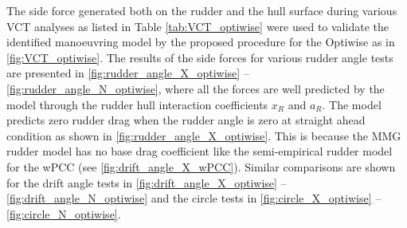 The side force generated both on the rudder and the hull surface during various VCT analyses as listed in Table \ref{tab:VCT_optiwise} were used to validate the identified manoeuvring model by the proposed procedure for the Optiwise as in \autoref{fig:VCT_optiwise}. The results of the side forces for various rudder angle tests are presented in \autoref{fig:rudder_angle_X_optiwise} -- \autoref{fig:rudder_angle_N_optiwise}, where all the forces are well predicted by the model through the rudder hull interaction coefficients $x_R$ and $a_R$. 
The model predicts zero rudder drag when the rudder angle is zero at straight ahead condition as shown in \autoref{fig:rudder_angle_X_optiwise}. This is because the MMG rudder model has no base drag coefficient like the semi-empirical rudder model for the wPCC (see \autoref{fig:drift_angle_X_wPCC}).
Similar comparisons are shown for the drift angle tests in \autoref{fig:drift_angle_X_optiwise} -- \autoref{fig:drift_angle_N_optiwise} and the circle tests in \autoref{fig:circle_X_optiwise} -- \autoref{fig:circle_N_optiwise}. 


